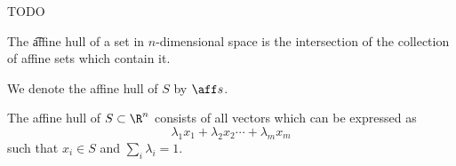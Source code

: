 

TODO


The \t{affine hull} of a set in $n$-dimensional space is the intersection of the collection of affine sets which contain it.


We denote the affine hull of $S$ by $\aff s$.

\begin{prop}
  The affine hull of $S \subset \R^n$ consists of all vectors which can be expressed as
  $$
    \lambda_1 x_1 + \lambda_2 x_2 \cdots + \lambda_m x_m
  $$
  such that $x_i \in S$ and $\sum_i \lambda_i = 1$.
\end{prop}

\blankpage
